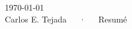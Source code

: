 \documentclass[11pt, a4paper]{awesome-resume}
\begin{document}
  \makecvheader
  \makecvfooter
    {\today\\}
    {Carlos E. Tejada~~~·~~~Resum\'e}
    {\thepage}

  
  
\end{document}
